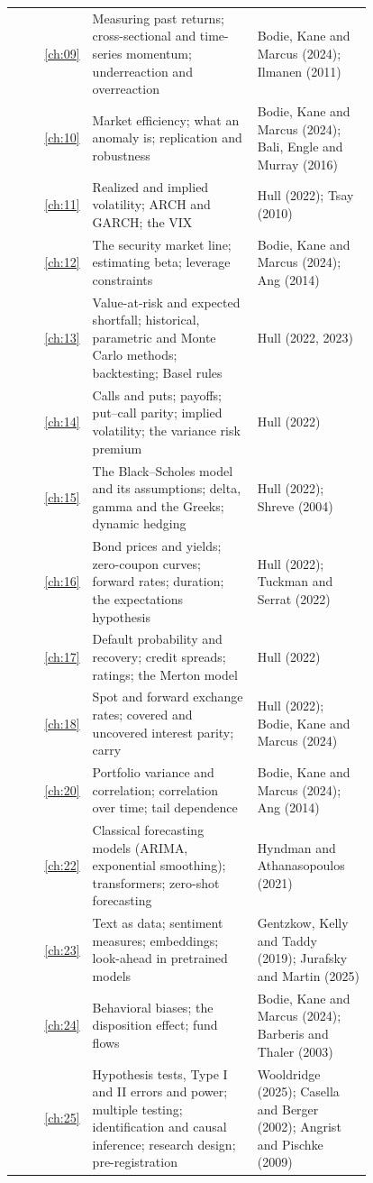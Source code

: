\begin{longtable}{@{}r>{\raggedright\arraybackslash}p{0.468\linewidth}>{\raggedright\arraybackslash}p{0.324\linewidth}@{}}
\ref{ch:09} & Measuring past returns; cross-sectional and time-series momentum; underreaction and overreaction & Bodie, Kane and Marcus (2024); Ilmanen (2011) \\
\ref{ch:10} & Market efficiency; what an anomaly is; replication and robustness & Bodie, Kane and Marcus (2024); Bali, Engle and Murray (2016) \\
\ref{ch:11} & Realized and implied volatility; ARCH and GARCH; the VIX & Hull (2022); Tsay (2010) \\
\ref{ch:12} & The security market line; estimating beta; leverage constraints & Bodie, Kane and Marcus (2024); Ang (2014) \\
\ref{ch:13} & Value-at-risk and expected shortfall; historical, parametric and Monte Carlo methods; backtesting; Basel rules & Hull (2022, 2023) \\
\ref{ch:14} & Calls and puts; payoffs; put--call parity; implied volatility; the variance risk premium & Hull (2022) \\
\ref{ch:15} & The Black--Scholes model and its assumptions; delta, gamma and the Greeks; dynamic hedging & Hull (2022); Shreve (2004) \\
\ref{ch:16} & Bond prices and yields; zero-coupon curves; forward rates; duration; the expectations hypothesis & Hull (2022); Tuckman and Serrat (2022) \\
\ref{ch:17} & Default probability and recovery; credit spreads; ratings; the Merton model & Hull (2022) \\
\ref{ch:18} & Spot and forward exchange rates; covered and uncovered interest parity; carry & Hull (2022); Bodie, Kane and Marcus (2024) \\
\ref{ch:20} & Portfolio variance and correlation; correlation over time; tail dependence & Bodie, Kane and Marcus (2024); Ang (2014) \\
\ref{ch:22} & Classical forecasting models (ARIMA, exponential smoothing); transformers; zero-shot forecasting & Hyndman and Athanasopoulos (2021) \\
\ref{ch:23} & Text as data; sentiment measures; embeddings; look-ahead in pretrained models & Gentzkow, Kelly and Taddy (2019); Jurafsky and Martin (2025) \\
\ref{ch:24} & Behavioral biases; the disposition effect; fund flows & Bodie, Kane and Marcus (2024); Barberis and Thaler (2003) \\
\ref{ch:25} & Hypothesis tests, Type I and II errors and power; multiple testing; identification and causal inference; research design; pre-registration & Wooldridge (2025); Casella and Berger (2002); Angrist and Pischke (2009) \\
\end{longtable}
\endgroup

